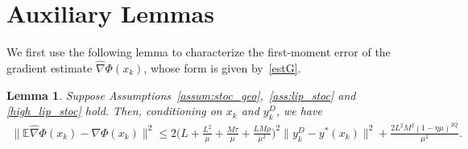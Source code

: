 \documentclass{osudissert96}
\newtheorem{lemma}{Lemma}
\begin{document}
\section{Auxiliary Lemmas}\label{se:supplemma}
We first use the following lemma to characterize the first-moment error of the gradient estimate $\widehat \nabla \Phi(x_k)$, whose form is given by~\cref{estG}. 
\begin{lemma}\label{le:first_m}
Suppose Assumptions~\ref{assum:stoc_geo},~\ref{ass:lip_stoc} and \ref{high_lip_stoc} hold.  Then, conditioning on $x_k$ and $y_k^D$, we have
{\small
\begin{align*}
\big\|\mathbb{E}\widehat \nabla \Phi(x_k)-\nabla \Phi(x_k)\big\|^2\leq 2 \Big( L+\frac{L^2}{\mu} + \frac{M\tau}{\mu}+\frac{LM\rho}{\mu^2}\Big)^2\|y_k^D-y^*(x_k)\|^2 +\frac{2L^2M^2(1-\eta \mu)^{2Q}}{\mu^2}.
\end{align*}}
\end{lemma}
\end{document}
